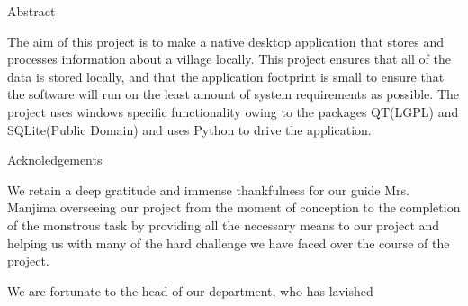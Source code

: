 \documentclass[12pt,a4paper]{article}
\begin{document}
\begin{center}
    \huge{Abstract}
\end{center}
The aim of this project is to make a native desktop application
that stores and processes information about a village locally.
This project ensures that all of the data is stored locally,
and that the application footprint is small to ensure that
the software will run on the least amount of system requirements
as possible. The project uses windows specific functionality owing
to the packages QT(LGPL) and SQLite(Public Domain) and uses Python
to drive the application.
\pagebreak
\begin{center}
    \huge{Acknoledgements}
\end{center}
We retain a deep gratitude and immense thankfulness for our guide Mrs. Manjima overseeing
our project from the moment of conception to the completion of the monstrous task by providing
all the necessary means to our project and helping us with many of the hard challenge we have 
faced over the course of the project.

We are fortunate to the head of our department, who has lavished 
\end{document}
